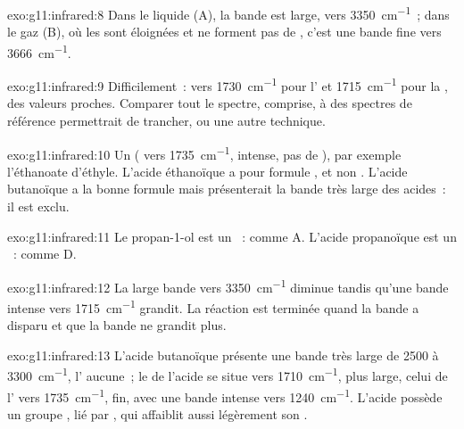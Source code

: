 \begin{solution}{exo:g11:infrared:8}
Dans le liquide (A), la bande  est large, vers
\qty{3350}{cm^{-1}}~; dans le gaz (B), où les  sont éloignées et
ne forment pas de , c'est une bande fine vers
\qty{3666}{cm^{-1}}.
\end{solution}

\begin{solution}{exo:g11:infrared:9}
Difficilement~: vers \qty{1730}{cm^{-1}} pour l' et
\qty{1715}{cm^{-1}} pour la , des valeurs proches. Comparer tout le
spectre,  comprise, à des spectres de référence
permettrait de trancher, ou une autre technique.
\end{solution}

\begin{solution}{exo:g11:infrared:10}
Un  ( vers \qty{1735}{cm^{-1}},  intense, pas de
), par exemple l'éthanoate d'éthyle. L'acide éthanoïque a pour
formule , et non . L'acide butanoïque a la bonne
formule mais présenterait la bande  très large des acides~: il
est exclu.
\end{solution}

\begin{solution}{exo:g11:infrared:11}
Le propan-1-ol est un ~: comme A. L'acide propanoïque est un ~: comme D.
\end{solution}

\begin{solution}{exo:g11:infrared:12}
La large bande  vers \qty{3350}{cm^{-1}} diminue tandis qu'une
bande  intense vers \qty{1715}{cm^{-1}} grandit. La réaction est
terminée quand la bande  a disparu et que la bande  ne
grandit plus.
\end{solution}

\begin{solution}{exo:g11:infrared:13}
L'acide butanoïque présente une bande  très large de 2500 à
\qty{3300}{cm^{-1}}, l' aucune~; le  de l'acide se situe
vers \qty{1710}{cm^{-1}}, plus large, celui de l' vers
\qty{1735}{cm^{-1}}, fin, avec une bande  intense vers
\qty{1240}{cm^{-1}}. L'acide possède un groupe , lié par , qui affaiblit aussi légèrement son .
\end{solution}

